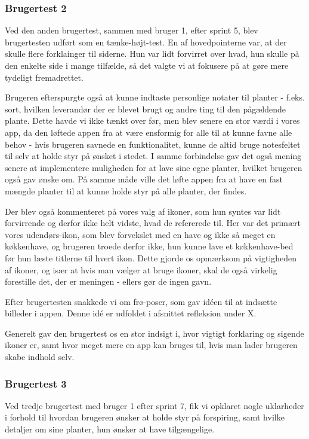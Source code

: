 \subsubsection{Brugertest 2}

Ved den anden brugertest, sammen med bruger 1, efter sprint 5, blev brugertesten udført som en tænke-højt-test. En af hovedpointerne var, at der skulle flere forklainger til siderne. Hun var lidt forvirret over hvad, hun skulle på den enkelte side i mange tilfælde, så det valgte vi at fokusere på at gøre mere tydeligt fremadrettet.

Brugeren efterspurgte også at kunne indtaste personlige notater til planter - f.eks. sort, hvilken leverandør der er blevet brugt og andre ting til den pågældende plante. Dette havde vi ikke tænkt over før, men blev senere en stor værdi i vores app, da den løftede appen fra at være ensformig for alle til at kunne favne alle behov - hvis brugeren savnede en funktionalitet, kunne de altid bruge notesfeltet til selv at holde styr på ønsket i stedet. I samme forbindelse gav det også mening senere at implementere muligheden for at lave sine egne planter, hvilket brugeren også gav ønske om. På samme måde ville det løfte appen fra at have en fast mængde planter til at kunne holde styr på alle planter, der findes.

Der blev også kommenteret på vores valg af ikoner, som hun syntes var lidt forvirrende og derfor ikke helt vidste, hvad de refererede til. Her var det primært vores udendørs-ikon, som blev forvekslet med en have og ikke så meget en køkkenhave, og brugeren troede derfor ikke, hun kunne lave et køkkenhave-bed før hun læste titlerne til hvert ikon. Dette gjorde os opmærksom på vigtigheden af ikoner, og især at hvis man vælger at bruge ikoner, skal de også virkelig forestille det, der er meningen - ellers gør de ingen gavn.

Efter brugertesten snakkede vi om frø-poser, som gav idéen til at indsætte billeder i appen. Denne idé er udfoldet i afsnittet refleksion under X.

Generelt gav den brugertest os en stor indsigt i, hvor vigtigt forklaring og sigende ikoner er, samt hvor meget mere en app kan bruges til, hvis man lader brugeren skabe indhold selv.

\subsubsection{Brugertest 3}

Ved tredje brugertest med bruger 1 efter sprint 7, fik vi opklaret nogle uklarheder i forhold til hvordan brugeren ønsker at holde styr på forspiring, samt hvilke detaljer om sine planter, hun ønsker at have tilgængelige.

